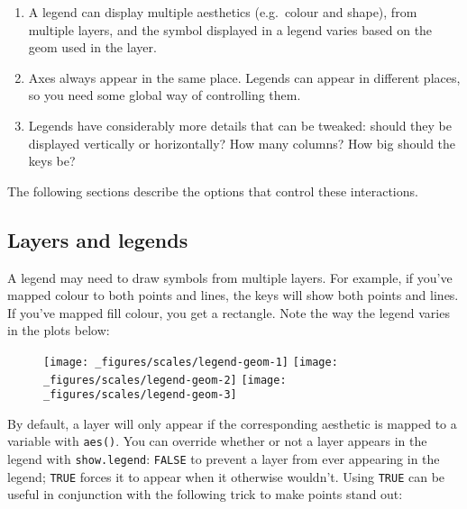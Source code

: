 \begin{enumerate}
\def\labelenumi{\arabic{enumi}.}
\item
  A legend can display multiple aesthetics (e.g.~colour and shape), from
  multiple layers, and the symbol displayed in a legend varies based on
  the geom used in the layer.
\item
  Axes always appear in the same place. Legends can appear in different
  places, so you need some global way of controlling them.
\item
  Legends have considerably more details that can be tweaked: should
  they be displayed vertically or horizontally? How many columns? How
  big should the keys be?
\end{enumerate}

The following sections describe the options that control these
interactions.

\hypertarget{sub-layers-legends}{%
\subsection{Layers and legends}\label{sub-layers-legends}}

A legend may need to draw symbols from multiple layers. For example, if
you've mapped colour to both points and lines, the keys will show both
points and lines. If you've mapped fill colour, you get a rectangle.
Note the way the legend varies in the plots below:

\begin{figure}[H]
  \texttt{[image: \_figures/scales/legend-geom-1]}%
  \texttt{[image: \_figures/scales/legend-geom-2]}%
  \texttt{[image: \_figures/scales/legend-geom-3]}
\end{figure}

By default, a layer will only appear if the corresponding aesthetic is
mapped to a variable with \texttt{aes()}. You can override whether or
not a layer appears in the legend with \texttt{show.legend}:
\texttt{FALSE} to prevent a layer from ever appearing in the legend;
\texttt{TRUE} forces it to appear when it otherwise wouldn't. Using
\texttt{TRUE} can be useful in conjunction with the following trick to
make points stand out:

